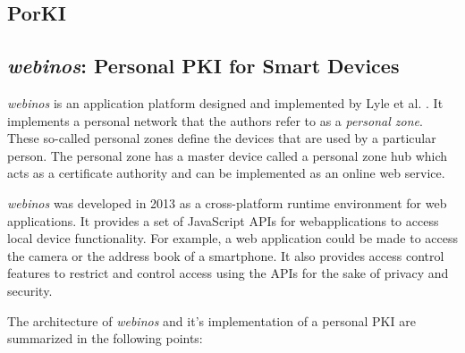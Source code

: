 \subsection{PorKI}

\subsection{\emph{webinos}: Personal PKI for Smart Devices}

\textit{webinos} is an application platform designed and implemented by Lyle et al. \cite{Lyle2013}. It implements a personal network that the authors refer to as a \textit{personal zone}. These so-called personal zones define the devices that are used by a particular person. The personal zone has a master device called a personal zone hub which acts as a certificate authority and can be implemented as an online web service.

\textit{webinos} was developed in 2013 as a cross-platform runtime environment for web applications. It provides a set of JavaScript APIs for webapplications to access local device functionality. For example, a web application could be made to access the camera or the address book of a smartphone. It also provides access control features to restrict and control access using the APIs for the sake of privacy and security.

The architecture of \textit{webinos} and it's implementation of a personal PKI are summarized in the following points:

